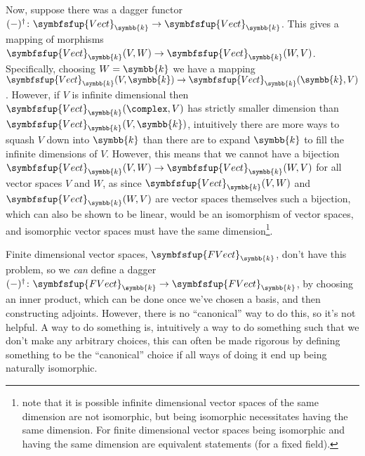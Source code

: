 \documentclass[fleqn]{NotesClass}
\makeatletter
\newcommand{\c@egory}[1]{\symbfsfup{#1}}
\renewcommand{\field}{\symbb{k}}
\newcommand{\Vect}[1][\field]{{\c@egory{Vect}_{#1}}}
\newcommand{\FVect}[1][\field]{{\c@egory{FVect}_{#1}}}
\makeatother
\begin{document}
    Now, suppose there was a dagger functor \((-)^{\dagger} \colon \Vect \to \Vect\).
    This gives a mapping of morphisms \(\Vect(V, W) \to \Vect(W, V)\).
    Specifically, choosing \(W = \field\) we have a mapping \(\Vect(V, \field) \to \Vect(\field, V)\).
    However, if \(V\) is infinite dimensional then \(\Vect(\complex, V)\) has strictly smaller dimension than \(\Vect(V, \field)\), intuitively there are more ways to squash \(V\) down into \(\field\) than there are to expand \(\field\) to fill the infinite dimensions of \(V\).
    However, this means that we cannot have a bijection \(\Vect(V, W) \to \Vect(W, V)\) for all vector spaces \(V\) and \(W\), as since \(\Vect(V, W)\) and \(\Vect(W, V)\) are vector spaces themselves such a bijection, which can also be shown to be linear, would be an isomorphism of vector spaces, and isomorphic vector spaces must have the same dimension\footnote{note that it is possible infinite dimensional vector spaces of the same dimension are not isomorphic, but being isomorphic necessitates having the same dimension. For finite dimensional vector spaces being isomorphic and having the same dimension are equivalent statements (for a fixed field).}.
    
    Finite dimensional vector spaces, \(\FVect\), don't have this problem, so we \emph{can} define a dagger \((-)^\dagger \colon \FVect \to \FVect\), by choosing an inner product, which can be done once we've chosen a basis, and then constructing adjoints.
    However, there is no \enquote{canonical} way to do this, so it's not helpful.
    A  way to do something is, intuitively a way to do something such that we don't make any arbitrary choices, this can often be made rigorous by defining something to be the \enquote{canonical} choice if all ways of doing it end up being naturally isomorphic.
    
\end{document}
